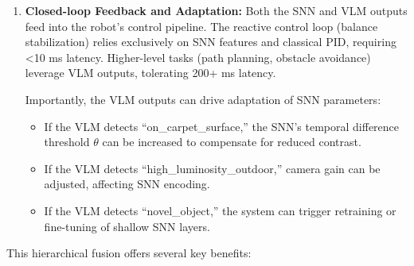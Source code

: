 \begin{enumerate}
    The VLM outputs semantic tokens: ``line_detected, position=center, confidence=0.95'', 
    ``obstacle_approaching_left, distance=$\approx$20cm, severity=medium''. These tokens are compact 
    (<<1 KB per frame) and enable task-level decision making.
    
    Latency: $\approx 100-300$ ms (acceptable for navigation planning, not real-time stabilization).
    
    Energy: $\approx 50-200$ mJ per inference, offset by amortization over multiple robot cycles.

    
\item \textbf{Closed-loop Feedback and Adaptation:}
    Both the SNN and VLM outputs feed into the robot's control pipeline. The reactive control loop (balance 
    stabilization) relies exclusively on SNN features and classical PID, requiring <10 ms latency. Higher-level 
    tasks (path planning, obstacle avoidance) leverage VLM outputs, tolerating 200+ ms latency.
    
    Importantly, the VLM outputs can drive adaptation of SNN parameters:
    \begin{itemize}
        \item If the VLM detects ``on_carpet_surface,'' the SNN's temporal difference threshold $\theta$ can be 
        increased to compensate for reduced contrast.
        
        \item If the VLM detects ``high_luminosity_outdoor,'' camera gain can be adjusted, affecting SNN encoding.
        
        \item If the VLM detects ``novel_object,'' the system can trigger retraining or fine-tuning of shallow SNN layers.
    \end{itemize}

\end{enumerate}

This hierarchical fusion offers several key benefits:

